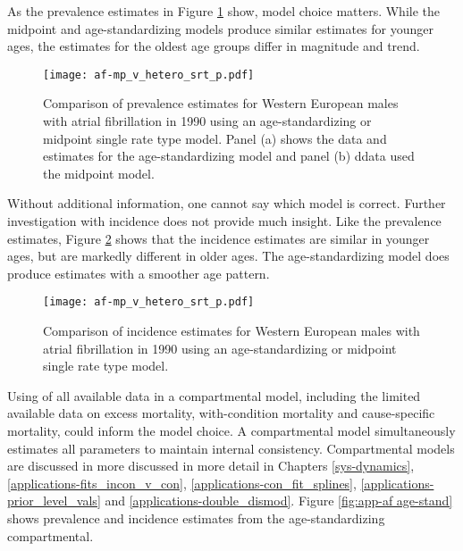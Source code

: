As the prevalence estimates in Figure \ref{fig:app-af srt p} show, model 
choice matters.  While the midpoint and age-standardizing models produce 
similar estimates for younger ages, the estimates for the oldest age groups 
differ in magnitude and trend.

    \begin{figure}[h]
        \begin{center}
            \texttt{[image: af-mp\_v\_hetero\_srt\_p.pdf]}
            \caption{Comparison of prevalence estimates for Western European 
              males with atrial fibrillation in 1990 using an age-standardizing
              or midpoint single rate type model.  Panel (a) shows the data and 
              estimates for the age-standardizing model and panel (b)
              ddata used the midpoint model.}
            \label{fig:app-af srt p}
        \end{center}
    \end{figure}

Without additional information, one cannot say which model is correct.  
Further investigation with incidence does not provide much insight.  Like 
the prevalence estimates, Figure \ref{fig:app-af srt i} shows that the 
incidence estimates are similar in younger ages, but are markedly different 
in older ages.  The age-standardizing model does produce estimates with a 
smoother age pattern.
    
    \begin{figure}[h]
        \begin{center}
            \texttt{[image: af-mp\_v\_hetero\_srt\_p.pdf]}
            \caption{Comparison of incidence estimates for Western European
              males with atrial fibrillation in 1990 using an age-standardizing
              or midpoint single rate type model.}
            \label{fig:app-af srt i}
        \end{center}
    \end{figure}
    
Using of all available data in a compartmental model, including the 
limited available data on excess mortality, with-condition mortality 
and cause-specific mortality, could inform the model choice.  
A compartmental model simultaneously estimates all parameters to 
maintain internal consistency.  Compartmental models are discussed 
in more discussed in more detail in Chapters \ref{sys-dynamics}, 
\ref{applications-fits_incon_v_con}, \ref{applications-con_fit_splines}, 
\ref{applications-prior_level_vals} and \ref{applications-double_dismod}.  
Figure \ref{fig:app-af age-stand} shows prevalence and incidence estimates 
from the age-standardizing compartmental.

